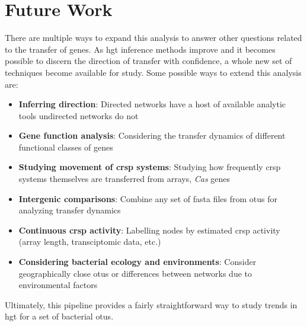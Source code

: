 \section{Future Work}
There are multiple ways to expand this analysis to answer other questions related to the transfer of genes.
As \ac{hgt} inference methods improve and it becomes possible to discern the direction of transfer with confidence, a whole new set of techniques become available for study.
Some possible ways to extend this analysis are:
\begin{itemize}
    \item \textbf{Inferring direction}: Directed networks have a host of available analytic tools undirected networks do not
    \item \textbf{Gene function analysis}: Considering the transfer dynamics of different functional classes of genes
    \item \textbf{Studying movement of \ac{crsp} systems}: Studying how frequently \ac{crsp} systems themselves are transferred from arrays, \textit{Cas} genes
    \item \textbf{Intergenic comparisons}: Combine any set of fasta files from \ac{otu}s for analyzing transfer dynamics
    \item \textbf{Continuous \ac{crsp} activity}: Labelling nodes by estimated \ac{crsp} activity (array length, transciptomic data, etc.)
    \item \textbf{Considering bacterial ecology and environments}: Consider geographically close \ac{otu}s or differences between networks due to environmental factors
\end{itemize}
Ultimately, this pipeline provides a fairly straightforward way to study trends in \ac{hgt} for a set of bacterial \ac{otu}s.
